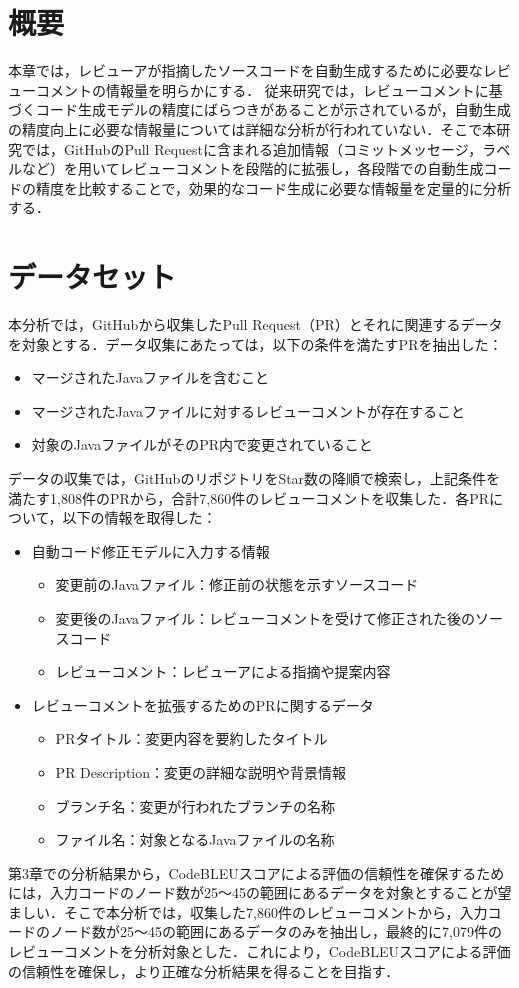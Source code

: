 \documentclass[11pt]{jreport}
\begin{document}
\section{概要}
本章では，レビューアが指摘したソースコードを自動生成するために必要なレビューコメントの情報量を明らかにする．
従来研究では，レビューコメントに基づくコード生成モデルの精度にばらつきがあることが示されているが，自動生成の精度向上に必要な情報量については詳細な分析が行われていない．そこで本研究では，GitHubのPull Requestに含まれる追加情報（コミットメッセージ，ラベルなど）を用いてレビューコメントを段階的に拡張し，各段階での自動生成コードの精度を比較することで，効果的なコード生成に必要な情報量を定量的に分析する．


\section{データセット}
本分析では，GitHubから収集したPull Request（PR）とそれに関連するデータを対象とする．データ収集にあたっては，以下の条件を満たすPRを抽出した：
\begin{itemize}
\item マージされたJavaファイルを含むこと
\item マージされたJavaファイルに対するレビューコメントが存在すること
\item 対象のJavaファイルがそのPR内で変更されていること
\end{itemize}
データの収集では，GitHubのリポジトリをStar数の降順で検索し，上記条件を満たす1,808件のPRから，合計7,860件のレビューコメントを収集した．各PRについて，以下の情報を取得した：
\begin{itemize}
\item 自動コード修正モデルに入力する情報
\begin{itemize}
\item 変更前のJavaファイル：修正前の状態を示すソースコード
\item 変更後のJavaファイル：レビューコメントを受けて修正された後のソースコード
\item レビューコメント：レビューアによる指摘や提案内容
\end{itemize}
\item レビューコメントを拡張するためのPRに関するデータ
\begin{itemize}
\item PRタイトル：変更内容を要約したタイトル
\item PR Description：変更の詳細な説明や背景情報
\item ブランチ名：変更が行われたブランチの名称
\item ファイル名：対象となるJavaファイルの名称
\end{itemize}
\end{itemize}
第3章での分析結果から，CodeBLEUスコアによる評価の信頼性を確保するためには，入力コードのノード数が25〜45の範囲にあるデータを対象とすることが望ましい．そこで本分析では，収集した7,860件のレビューコメントから，入力コードのノード数が25〜45の範囲にあるデータのみを抽出し，最終的に7,079件のレビューコメントを分析対象とした．これにより，CodeBLEUスコアによる評価の信頼性を確保し，より正確な分析結果を得ることを目指す．
\end{document}
